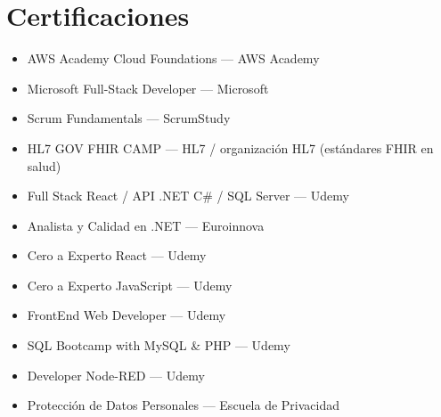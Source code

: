 \documentclass[11pt,a4paper]{article}
\begin{document}
\section{Certificaciones}
\begin{itemize}[noitemsep, topsep=0pt]
   \item AWS Academy Cloud Foundations --- AWS Academy
    \item Microsoft Full-Stack Developer --- Microsoft
    \item Scrum Fundamentals --- ScrumStudy
    \item HL7 GOV FHIR CAMP --- HL7 / organización HL7 (estándares FHIR en salud)

    \item Full Stack React / API .NET C\# / SQL Server --- Udemy
    \item Analista y Calidad en .NET --- Euroinnova
    \item Cero a Experto React --- Udemy
    \item Cero a Experto JavaScript --- Udemy

    \item FrontEnd Web Developer --- Udemy
    \item SQL Bootcamp with MySQL \& PHP --- Udemy
    \item Developer Node-RED --- Udemy

    \item Protección de Datos Personales --- Escuela de Privacidad
\end{itemize}
\end{document}
